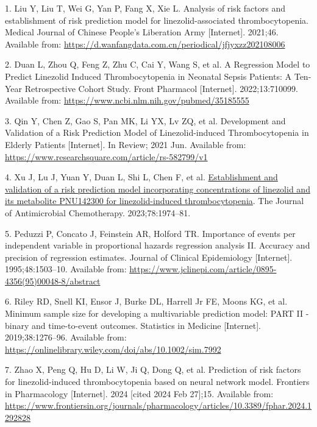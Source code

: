 \documentclass[
  letterpaper,
  DIV=11,
  numbers=noendperiod]{scrartcl}
\newlength{\cslhangindent}
\newenvironment{CSLReferences}[2] %
 {\begin{list}{}{%
  \setlength{\itemindent}{0pt}
  \setlength{\leftmargin}{0pt}
  \setlength{\parsep}{0pt}
  \ifodd #1
   \setlength{\leftmargin}{\cslhangindent}
   \setlength{\itemindent}{-1\cslhangindent}
  \fi
  \setlength{\itemsep}{#2\baselineskip}}}
 {\end{list}}
\begin{document}
\label{refs}
\begin{CSLReferences}{0}{1}
1. Liu Y, Liu T, Wei G, Yan P, Fang X, Xie L. Analysis of risk factors
and establishment of risk prediction model for linezolid-associated
thrombocytopenia. Medical Journal of Chinese People's Liberation Army
{[}Internet{]}. 2021;46. Available from:
\url{https://d.wanfangdata.com.cn/periodical/jfjyxzz202108006}

2. Duan L, Zhou Q, Feng Z, Zhu C, Cai Y, Wang S, et al. A {Regression}
{Model} to {Predict} {Linezolid} {Induced} {Thrombocytopenia} in
{Neonatal} {Sepsis} {Patients}: {A} {Ten}-{Year} {Retrospective}
{Cohort} {Study}. Front Pharmacol {[}Internet{]}. 2022;13:710099.
Available from: \url{https://www.ncbi.nlm.nih.gov/pubmed/35185555}

3. Qin Y, Chen Z, Gao S, Pan MK, Li YX, Lv ZQ, et al. Development and
{Validation} of a {Risk} {Prediction} {Model} of {Linezolid}-induced
{Thrombocytopenia} in {Elderly} {Patients} {[}Internet{]}. In Review;
2021 Jun. Available from:
\url{https://www.researchsquare.com/article/rs-582799/v1}

4. Xu J, Lu J, Yuan Y, Duan L, Shi L, Chen F, et al.
\href{https://doi.org/10.1093/jac/dkad191}{Establishment and validation
of a risk prediction model incorporating concentrations of linezolid and
its metabolite {PNU142300} for linezolid-induced thrombocytopenia}. The
Journal of Antimicrobial Chemotherapy. 2023;78:1974--81.

5. Peduzzi P, Concato J, Feinstein AR, Holford TR. Importance of events
per independent variable in proportional hazards regression analysis II.
Accuracy and precision of regression estimates. Journal of Clinical
Epidemiology {[}Internet{]}. 1995;48:1503--10. Available from:
\url{https://www.jclinepi.com/article/0895-4356(95)00048-8/abstract}

6. Riley RD, Snell KI, Ensor J, Burke DL, Harrell Jr FE, Moons KG, et
al. Minimum sample size for developing a multivariable prediction model:
PART II - binary and time-to-event outcomes. Statistics in Medicine
{[}Internet{]}. 2019;38:1276--96. Available from:
\url{https://onlinelibrary.wiley.com/doi/abs/10.1002/sim.7992}

7. Zhao X, Peng Q, Hu D, Li W, Ji Q, Dong Q, et al. Prediction of risk
factors for linezolid-induced thrombocytopenia based on neural network
model. Frontiers in Pharmacology {[}Internet{]}. 2024 {[}cited 2024 Feb
27{]};15. Available from:
\url{https://www.frontiersin.org/journals/pharmacology/articles/10.3389/fphar.2024.1292828}


\end{CSLReferences}
\end{document}
